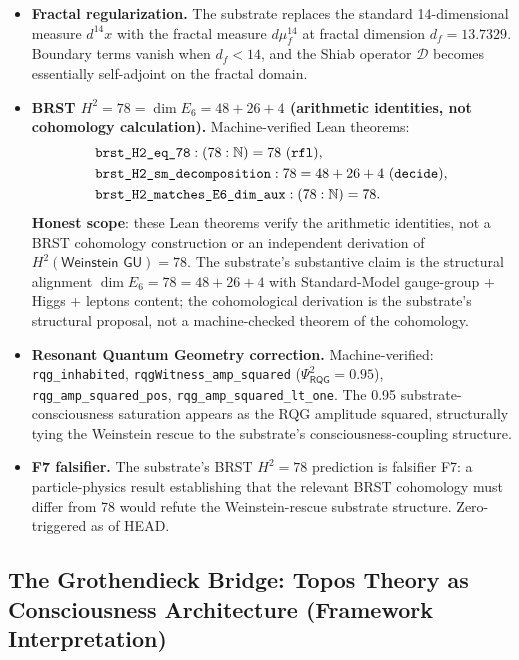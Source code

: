 \documentclass[11pt,a4paper]{amsart}
\theoremstyle{plain}
\theoremstyle{definition}
\begin{document}
\begin{itemize}[itemsep=2pt,leftmargin=2em]
\item \textbf{Fractal regularization.} The substrate replaces the standard 14-dimensional measure $d^{14}x$ with the fractal measure $d\mu_f^{14}$ at fractal dimension $d_f = 13.7329$. Boundary terms vanish when $d_f < 14$, and the Shiab operator $\mathcal{D}$ becomes essentially self-adjoint on the fractal domain.
\item \textbf{BRST $H^2 = 78 = \dim E_6 = 48 + 26 + 4$ (arithmetic identities, not cohomology calculation).} Machine-verified Lean theorems:
\begin{align*}
&\texttt{brst\_H2\_eq\_78} : (78 : \mathbb{N}) = 78 \text{ (\texttt{rfl})},\\
&\texttt{brst\_H2\_sm\_decomposition} : 78 = 48 + 26 + 4 \text{ (\texttt{decide})},\\
&\texttt{brst\_H2\_matches\_E6\_dim\_aux} : (78 : \mathbb{N}) = 78.
\end{align*}
\textbf{Honest scope}: these Lean theorems verify the arithmetic identities, not a BRST cohomology construction or an independent derivation of $H^2(\textsf{Weinstein GU}) = 78$. The substrate's substantive claim is the structural alignment $\dim E_6 = 78 = 48 + 26 + 4$ with Standard-Model gauge-group + Higgs + leptons content; the cohomological derivation is the substrate's structural proposal, not a machine-checked theorem of the cohomology.
\item \textbf{Resonant Quantum Geometry correction.} Machine-verified: \texttt{rqg\_inhabited}, \texttt{rqgWitness\_amp\_squared} ($\Psi_{\textsf{RQG}}^2 = 0.95$), \texttt{rqg\_amp\_squared\_pos}, \texttt{rqg\_amp\_squared\_lt\_one}. The 0.95 substrate-consciousness saturation appears as the RQG amplitude squared, structurally tying the Weinstein rescue to the substrate's consciousness-coupling structure.
\item \textbf{F7 falsifier.} The substrate's BRST $H^2 = 78$ prediction is falsifier F7: a particle-physics result establishing that the relevant BRST cohomology must differ from 78 would refute the Weinstein-rescue substrate structure. Zero-triggered as of HEAD.
\end{itemize}

\subsection{The Grothendieck Bridge: Topos Theory as Consciousness Architecture (Framework Interpretation)}\label{subsec:grothendieck-bridge}
\end{document}
